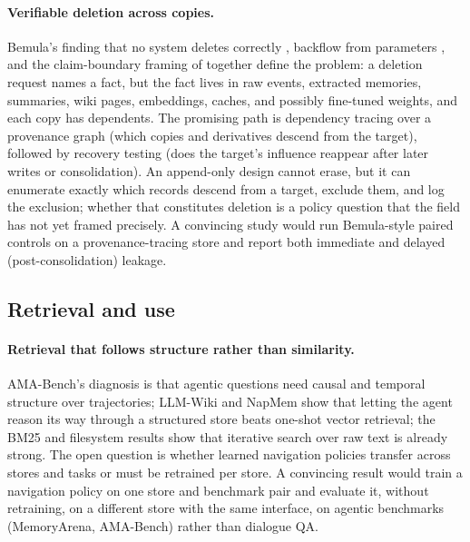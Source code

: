 \documentclass[11pt]{article}
\begin{document}
\paragraph{Verifiable deletion across copies.}
Bemula's finding that no system deletes correctly \citep{xie2026bemula}, backflow from parameters \citep{wang2026unlearning}, and the claim-boundary framing of \citet{xu2026unlearningsurvey} together define the problem: a deletion request names a fact, but the fact lives in raw events, extracted memories, summaries, wiki pages, embeddings, caches, and possibly fine-tuned weights, and each copy has dependents. The promising path is dependency tracing over a provenance graph (which copies and derivatives descend from the target), followed by recovery testing (does the target's influence reappear after later writes or consolidation). An append-only design cannot erase, but it can enumerate exactly which records descend from a target, exclude them, and log the exclusion; whether that constitutes deletion is a policy question that the field has not yet framed precisely. A convincing study would run Bemula-style paired controls on a provenance-tracing store and report both immediate and delayed (post-consolidation) leakage.

\subsection{Retrieval and use}

\paragraph{Retrieval that follows structure rather than similarity.}
AMA-Bench's diagnosis \citep{zhao2026amabench} is that agentic questions need causal and temporal structure over trajectories; LLM-Wiki \citep{ming2026llmwiki} and NapMem \citep{xu2026napmem} show that letting the agent reason its way through a structured store beats one-shot vector retrieval; the BM25 and filesystem results show that iterative search over raw text is already strong. The open question is whether learned navigation policies transfer across stores and tasks or must be retrained per store. A convincing result would train a navigation policy on one store and benchmark pair and evaluate it, without retraining, on a different store with the same interface, on agentic benchmarks (MemoryArena, AMA-Bench) rather than dialogue QA.
\end{document}
